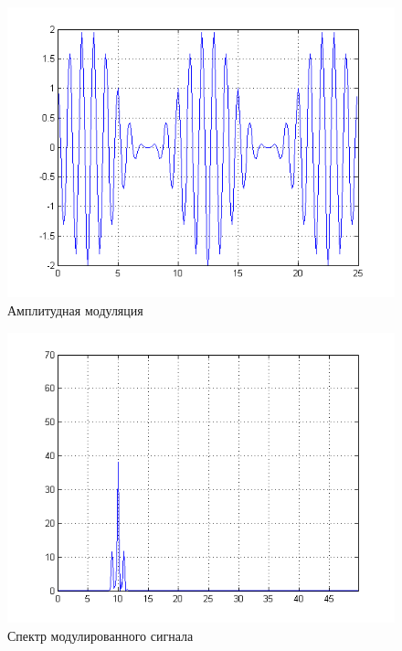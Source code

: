 \begin{figure}[H]
   \includegraphics[scale=0.7]{lab7/AM.png}
   \caption{Амплитудная модуляция}
\end{figure}

\begin{figure}[H]
   \includegraphics[scale=0.7]{lab7/AM_spectro.png}
   \caption{Спектр модулированного сигнала}
\end{figure}

